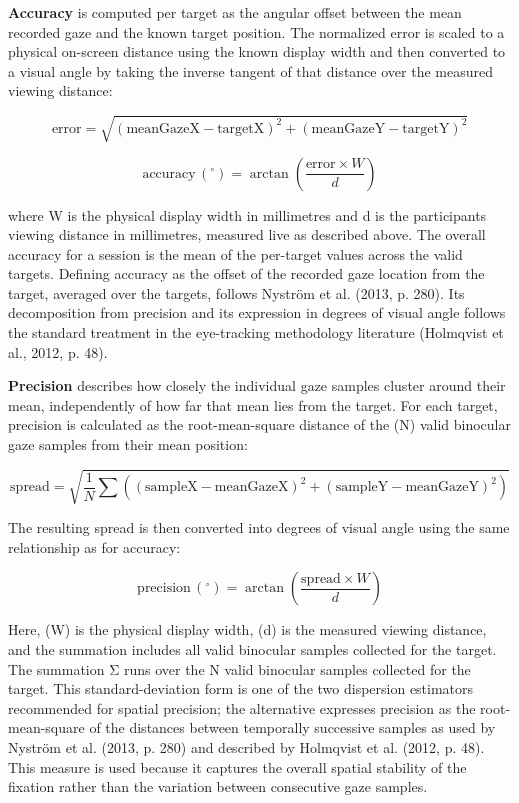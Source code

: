 \documentclass[
]{article}
\begin{document}
\textbf{Accuracy} is computed per target as the angular offset between the mean recorded gaze and the known target position. The normalized error is scaled to a physical on-screen distance using the known display width and then converted to a visual angle by taking the inverse tangent of that distance over the measured viewing distance:

\[ \text{error} = \sqrt{(\text{meanGazeX} - \text{targetX})^{2} + (\text{meanGazeY} - \text{targetY})^{2}} \]

\[ \text{accuracy}\,(^{\circ}) = \arctan\!\left(\frac{\text{error} \times W}{d}\right) \]

where W is the physical display width in millimetres and d is the participant\textquotesingle s viewing distance in millimetres, measured live as described above. The overall accuracy for a session is the mean of the per-target values across the valid targets. Defining accuracy as the offset of the recorded gaze location from the target, averaged over the targets, follows Nyström et al. (2013, p. 280). Its decomposition from precision and its expression in degrees of visual angle follows the standard treatment in the eye-tracking methodology literature (Holmqvist et al., 2012, p. 48).

\textbf{Precision} describes how closely the individual gaze samples cluster around their mean, independently of how far that mean lies from the target. For each target, precision is calculated as the root-mean-square distance of the (N) valid binocular gaze samples from their mean position:

\[ \text{spread} = \sqrt{\frac{1}{N} \sum \left((\text{sampleX} - \text{meanGazeX})^{2} + (\text{sampleY} - \text{meanGazeY})^{2}\right)} \]

The resulting spread is then converted into degrees of visual angle using the same relationship as for accuracy:

\[ \text{precision}\,(^{\circ}) = \arctan\!\left(\frac{\text{spread} \times W}{d}\right) \]

Here, (W) is the physical display width, (d) is the measured viewing distance, and the summation includes all valid binocular samples collected for the target. The summation Σ runs over the N valid binocular samples collected for the target. This standard-deviation form is one of the two dispersion estimators recommended for spatial precision; the alternative expresses precision as the root-mean-square of the distances between temporally successive samples as used by Nyström et al. (2013, p. 280) and described by Holmqvist et al. (2012, p. 48). This measure is used because it captures the overall spatial stability of the fixation rather than the variation between consecutive gaze samples.
\end{document}
